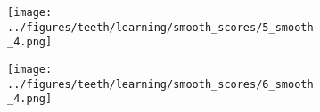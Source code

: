 \begin{figure}[h!]
\begin{subfigure}{0.15\textwidth}
		\label{fig:1}
	\end{subfigure}
	\begin{subfigure}{0.15\textwidth}
		\centering
		\texttt{[image: ../figures/teeth/learning/smooth\_scores/5\_smooth\_4.png]}
		\label{fig:1}
	\end{subfigure}
	\begin{subfigure}{0.15\textwidth}
		\centering
		\texttt{[image: ../figures/teeth/learning/smooth\_scores/6\_smooth\_4.png]}
		\label{fig:1}
	\end{subfigure}
	\vspace{-0.35cm}
	\\
		\begin{subfigure}[b]{0.03\textwidth} %
		\centering
	\end{subfigure}

\end{figure}

